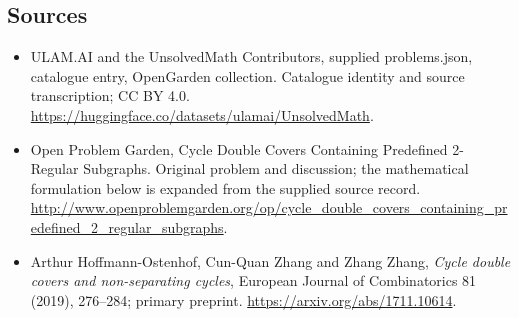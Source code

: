 \documentclass[11pt,a4paper]{article}
\begin{document}
\subsection{Sources}
\begin{itemize}
\item[S1] ULAM.AI and the UnsolvedMath Contributors, supplied problems.json, catalogue entry, OpenGarden collection. Catalogue identity and source transcription; CC BY 4.0.
\url{https://huggingface.co/datasets/ulamai/UnsolvedMath}.
\item[S2] Open Problem Garden, Cycle Double Covers Containing Predefined 2-Regular Subgraphs. Original problem and discussion; the mathematical formulation below is expanded from the supplied source record.
\url{http://www.openproblemgarden.org/op/cycle_double_covers_containing_predefined_2_regular_subgraphs}.

\item[R1] Arthur Hoffmann-Ostenhof, Cun-Quan Zhang and Zhang Zhang,
\emph{Cycle double covers and non-separating cycles}, European
Journal of Combinatorics 81 (2019), 276--284; primary preprint.
\url{https://arxiv.org/abs/1711.10614}.

\end{itemize}
\end{document}
